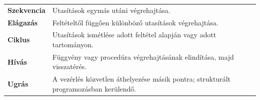 \begin{tabularx}{\textwidth}{>{\bfseries}lX}
Szekvencia & Utasítások egymás utáni végrehajtása. \\
Elágazás & Feltételtől függően különböző utasítások végrehajtása. \\
Ciklus & Utasítások ismétlése adott feltétel alapján vagy adott tartományon. \\
Hívás & Függvény vagy procedúra végrehajtásának elindítása, majd visszatérés. \\
Ugrás & A vezérlés közvetlen áthelyezése másik pontra; strukturált programozásban kerülendő. \\
\end{tabularx}
